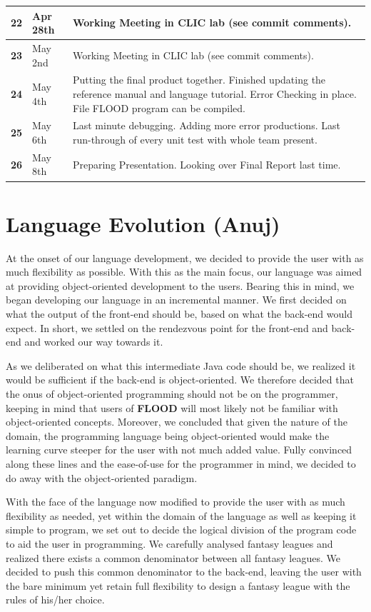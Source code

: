 \documentclass[12pt]{report}
\begin{document}
\begin{flushleft}
\begin{singlespace}
\begin{tabular}{ | p{2cm} | p{1.8cm} | p{12cm} | }
\hline
\textbf{22} & Apr 28th & Working Meeting in CLIC lab (see commit comments).\\
\hline
\textbf{23} & May 2nd & Working Meeting in CLIC lab (see commit comments).\\
\hline
\textbf{24} & May 4th & Putting the final product together. Finished updating the reference manual and language tutorial. Error Checking in place. File FLOOD program can be compiled.\\
\hline
\textbf{25} & May 6th & Last minute debugging. Adding more error productions. Last run-through of every unit test with whole team present.\\
\hline
\textbf{26} & May 8th & Preparing Presentation. Looking over Final Report last time.\\
\hline
\end{tabular}
\end{singlespace}
\end{flushleft}


\chapter{Language Evolution (Anuj)}

At the onset of our language development, we decided to provide the user with as much flexibility as possible. With this as the main focus, our language was aimed at providing object-oriented development to the users. Bearing this in mind, we began developing our language in an incremental manner. We first decided on what the output of the front-end should be, based on what the back-end would expect. In short, we settled on the rendezvous point for the front-end and back-end and worked our way towards it.

As we deliberated on what this intermediate Java code should be, we realized it would be sufficient if the back-end is object-oriented. We therefore decided that the onus of object-oriented programming should not be on the programmer, keeping in mind that users of \textbf{FLOOD} will most likely not be familiar with object-oriented concepts. Moreover, we concluded that given the nature of the domain, the programming language being object-oriented would make the learning curve steeper for the user with not much added value. Fully convinced along these lines and the ease-of-use for the programmer in mind, we decided to do away with the object-oriented paradigm.
 
With the face of the language now modified to provide the user with as much flexibility as needed, yet within the domain of the language as well as keeping it simple to program, we set out to decide the logical division of the program code to aid the user in programming. We carefully analysed fantasy leagues and realized there exists a common denominator between all fantasy leagues. We decided to push this common denominator to the back-end, leaving the user with the bare minimum yet retain full flexibility to design a fantasy league with the rules of his/her choice.
\end{document}
